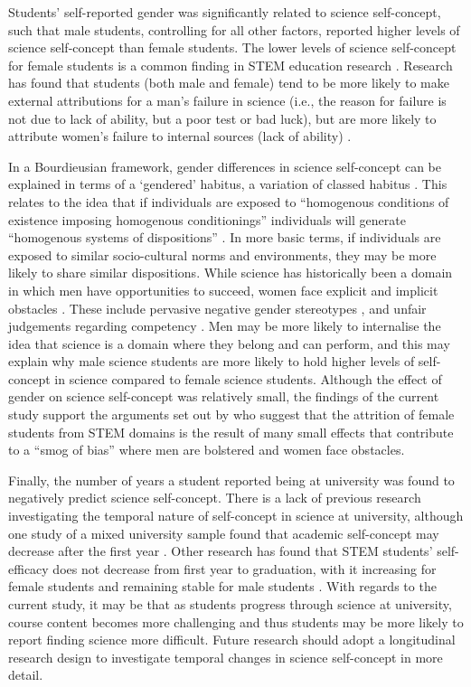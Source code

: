 Students' self-reported gender was significantly related to science self-concept, such that male students, controlling for all other factors, reported higher levels of science self-concept than female students. The lower levels of science self-concept for female students is a common finding in STEM education research \citep{sax2015but,Ellis_2016}. Research has found that students (both male and female) tend to be more likely to make external attributions for a man's failure in science (i.e., the reason for failure is not due to lack of ability, but a poor test or bad luck), but are more likely to attribute women's failure to internal sources (lack of ability) \citep{LaCosse_2016}. 

In a Bourdieusian framework, gender differences in science self-concept can be explained in terms of a `gendered' habitus, a variation of classed habitus \citep{Reay_2004}. This relates to the idea that if individuals are exposed to ``homogenous conditions of existence imposing homogenous conditionings'' individuals will generate ``homogenous systems of dispositions'' \cite[p.101]{Bourdieu1984}. In more basic terms, if individuals are exposed to similar socio-cultural norms and environments, they may be more likely to share similar dispositions. While science has historically been a domain in which men have opportunities to succeed, women face explicit and implicit obstacles \citep{cheryan2017some,Blickenstaff_2005}. These include pervasive negative gender stereotypes \citep{Nosek_2009}, and unfair judgements regarding competency \citep{Moss_2012,Barthelemy_2016}. Men may be more likely to internalise the idea that science is a domain where they belong and can perform, and this may explain why male science students are more likely to hold higher levels of self-concept in science compared to female science students. Although the effect of gender on science self-concept was relatively small, the findings of the current study support the arguments set out by \cite{Kost_Smith_2010} who suggest that the attrition of female students from STEM domains is the result of many small effects that contribute to a ``smog of bias'' where men are bolstered and women face obstacles. 

Finally, the number of years a student reported being at university was found to negatively predict science self-concept. There is a lack of previous research investigating the temporal nature of self-concept in science at university, although one study of a mixed university sample found that academic self-concept may decrease after the first year \citep{isiksal2010comparative}. Other research has found that STEM students' self-efficacy does not decrease from first year to graduation, with it increasing for female students and remaining stable for male students \citep{macphee2013academic}. With regards to the current study, it may be that as students progress through science at university, course content becomes more challenging and thus students may be more likely to report finding science more difficult. Future research should adopt a longitudinal research design to investigate temporal changes in science self-concept in more detail. 

